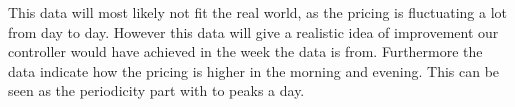 This data will most likely not fit the real world, as the pricing is fluctuating a lot from day to day. However this data will give a realistic idea of improvement our controller would have achieved in the week the data is from. Furthermore the data indicate how the pricing is higher in the morning and evening. This can be seen as the periodicity part with to peaks a day.


